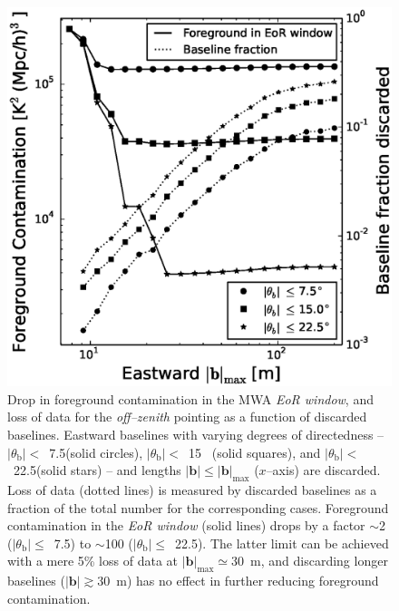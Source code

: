 \documentclass[preprint2,iop,numberedappendix,twocolappendix,appendixfloats]{emulateapj}
\begin{document}
\begin{figure}[htb]
\centering
\includegraphics[width=\linewidth]{figure11.eps}
\caption{Drop in foreground contamination in the MWA {\it EoR window}, and loss of data for the {\it off--zenith} pointing as a function of discarded baselines. Eastward baselines with varying degrees of directedness -- $|\theta_\textrm{b}|<$~7.5\arcdeg (solid circles), $|\theta_\textrm{b}|<$~15\arcdeg~ (solid squares), and $|\theta_\textrm{b}|<$~22.5\arcdeg (solid stars) -- and lengths $|\boldsymbol{b}| \le |\boldsymbol{b}|_\textrm{max}$ ($x$--axis) are discarded. Loss of data (dotted lines) is measured by discarded baselines as a fraction of the total number for the corresponding cases. Foreground contamination in the {\it EoR window} (solid lines) drops by a factor $\sim$2 ($|\theta_\textrm{b}|\le$~7.5\arcdeg) to $\sim$100 ($|\theta_\textrm{b}|\le$~22.5\arcdeg). The latter limit can be achieved with a mere 5\% loss of data at $|\boldsymbol{b}|_\textrm{max}\simeq30$~m, and discarding longer baselines ($|\boldsymbol{b}|\gtrsim 30$~m) has no effect in further reducing foreground contamination. \label{fig:screening}}
\end{figure}
\end{document}
